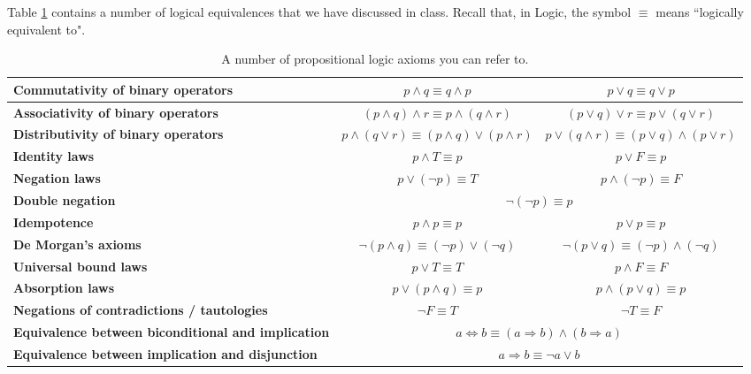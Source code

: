 \documentclass[letterpaper,12pt]{article}
\begin{document}
Table \ref{tbl:propLogicAxioms} contains a number of logical equivalences that we have discussed in class. Recall that, in Logic, the symbol $\equiv$ means ``logically equivalent to". 

\begin{table}[H]
	\centering
	\renewcommand*{\arraystretch}{1.2}
	\begin{tabular}{|>{\centering\arraybackslash}p{1.5in} | c | c |} \hline
		\textbf{Commutativity of binary operators} & $p \land q \equiv q \land p$ & $p \lor q \equiv q \lor p$ \\ \hline
	\textbf{Associativity of binary operators} & $(p \land q) \land r \equiv p \land (q \land r)$ &  $(p \lor q) \lor r \equiv p \lor (q \lor r)$ \\ \hline
	\textbf{Distributivity of binary operators} & $p \land (q \lor r) \equiv (p \land q) \lor (p \land r)$ & $p \lor (q \land r) \equiv (p \lor q) \land (p \lor r)$ \\ \hline
	\textbf{Identity laws} & $p \land T \equiv p$ & $p \lor F \equiv p$ \\ \hline
	\textbf{Negation laws} & $p \lor (\neg p) \equiv T$ & $p \land (\neg p) \equiv F$ \\ \hline
	\textbf{Double negation} & \multicolumn{2}{c|}{$\neg (\neg p) \equiv p$}  \\ \hline 
	\textbf{Idempotence} & $p \land p \equiv p$ & $p \lor p \equiv p$ \\ \hline
	\textbf{De Morgan's axioms} & $\neg (p \land q) \equiv (\neg p )\lor (\neg q)$ & $\neg (p \lor q) \equiv (\neg p) \land (\neg q)$\\ \hline
	\textbf{Universal bound laws} & $p \lor T \equiv T$ & $p \land F \equiv F$ \\ \hline
	\textbf{Absorption laws} & $p \lor (p \land q) \equiv p$ & $p \land (p \lor q) \equiv p$ \\ \hline
	\textbf{Negations of contradictions / tautologies} & $\neg F \equiv T$ & $\neg T \equiv F$ \\ \hline
	\textbf{Equivalence between biconditional and implication} & \multicolumn{2}{c|}{$a \Leftrightarrow b \equiv (a \Rightarrow b) \land (b \Rightarrow a)$} \\ \hline
	\textbf{Equivalence between implication and disjunction} & \multicolumn{2}{c|}{$a \Rightarrow b \equiv \neg a \lor b$} \\ \hline
	\end{tabular} \vspace{.1in}
	\caption{A number of propositional logic axioms you can refer to.}
	\label{tbl:propLogicAxioms}
\end{table}
 
\end{document}
